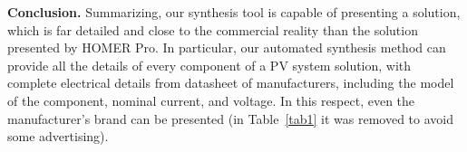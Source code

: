 \documentclass[runningheads]{llncs}
\begin{document}
\noindent \textbf{Conclusion.} Summarizing, our synthesis tool is capable of presenting a solution, which is far detailed and close to the commercial reality than the solution presented by HOMER Pro. In particular, our automated synthesis method can provide all the details of every component of a PV system solution, with complete electrical details from datasheet of manufacturers, including the model of the component, nominal current, and voltage. In this respect, even the manufacturer's brand can be presented (in Table~\ref{tab1} it was removed to avoid some advertising).
%
\end{document}
